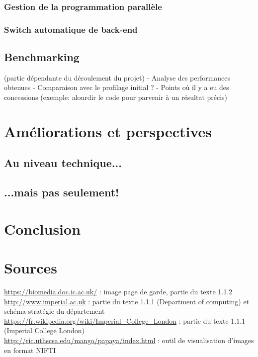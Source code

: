 \documentclass[10pt]{report}
\begin{document}
	\subsection{Gestion de la programmation parallèle}

	

	
	\subsection{Switch automatique de back-end}

	\section{Benchmarking}
	(partie dépendante du déroulement du projet)\newline
	- Analyse des performances obtenues \newline
	- Comparaison avec le profilage initial ? \newline
	- Points où il y a eu des concessions (exemple: alourdir le code pour parvenir à un résultat précis)
	
\chapter{Améliorations et perspectives}
	\section{Au niveau technique...}
	\section{...mais pas seulement!}

\chapter*{Conclusion} %
\chapter*{Sources}
\noindent
\url{https://biomedia.doc.ic.ac.uk/}  : image page de garde, partie du texte 1.1.2 \\
\url{http://www.imperial.ac.uk} : partie du texte 1.1.1 (Department of computing) et schéma stratégie du département\\
\url{https://fr.wikipedia.org/wiki/Imperial_College_London} : partie du texte 1.1.1 (Imperial College London)\\
\url{http://ric.uthscsa.edu/mango/papaya/index.html} : outil de visualisation d'images en format NIFTI
\renewcommand{\listfigurename}{Table des illustations}
\listoffigures
{}
\end{document}
